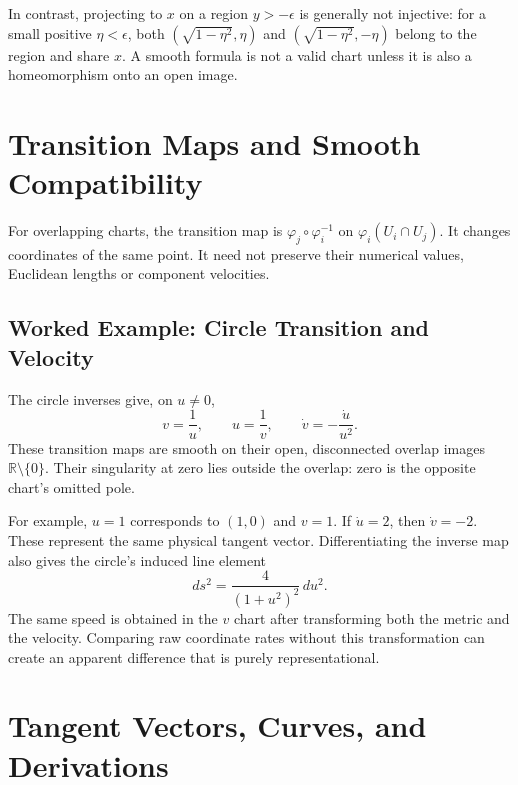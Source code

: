In contrast, projecting to $x$ on a region $y>-\epsilon$ is generally not injective: for a small positive $\eta<\epsilon$, both $(\sqrt{1-\eta^2},\eta)$ and $(\sqrt{1-\eta^2},-\eta)$ belong to the region and share $x$. A smooth formula is not a valid chart unless it is also a homeomorphism onto an open image.

\section{Transition Maps and Smooth Compatibility}
\label{sec:transitions}
\label{def:differentiable_manifold}
\label{def:transition_map}

For overlapping charts, the transition map is $\varphi_j\circ\varphi_i^{-1}$ on $\varphi_i(U_i\cap U_j)$. It changes coordinates of the same point. It need not preserve their numerical values, Euclidean lengths or component velocities.

\subsection{Worked Example: Circle Transition and Velocity}
\label{example:circle_transition}
\label{ex:ex_circle_transition}

The circle inverses give, on $u\ne0$,
\begin{equation}
 v=\frac1u,\qquad u=\frac1v,\qquad
 \dot v=-\frac{\dot u}{u^2}.
\end{equation}
These transition maps are smooth on their open, disconnected overlap images $\mathbb R\setminus\{0\}$. Their singularity at zero lies outside the overlap: zero is the opposite chart's omitted pole.

For example, $u=1$ corresponds to $(1,0)$ and $v=1$. If $\dot u=2$, then $\dot v=-2$. These represent the same physical tangent vector. Differentiating the inverse map also gives the circle's induced line element
\begin{equation}
 ds^2=\frac{4}{(1+u^2)^2}\,du^2.
\end{equation}
The same speed is obtained in the $v$ chart after transforming both the metric and the velocity. Comparing raw coordinate rates without this transformation can create an apparent difference that is purely representational.

\section{Tangent Vectors, Curves, and Derivations}
\label{sec:tangent_vectors}
\label{laymans:tangent_bundle_reminder}
\label{def:tangent_bundle}
\label{thm:tangent_equivalence}
\label{def:tangent_derivation}
\label{def:tangent_curve}
\label{def:tangent_space}

